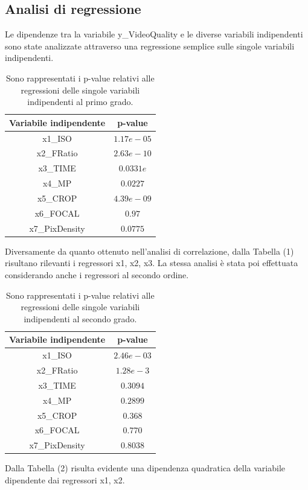 \subsection{Analisi di regressione}
Le dipendenze tra la variabile y\_VideoQuality e le diverse variabili indipendenti sono state analizzate attraverso una regressione semplice sulle singole variabili indipendenti.
\begin{table}[H]
	\centering
	\begin{tabular}{|c|c|}
		\hline
		\textbf{Variabile indipendente} & \textbf{p-value} \\
		\hline
		x1\_ISO & $1.17e-05$ \\
		\hline
		x2\_FRatio & $2.63e-10$ \\ 
		\hline
		x3\_TIME & $0.0331e$ \\
		\hline
		x4\_MP & $0.0227$ \\
		\hline
		x5\_CROP & $4.39e-09$ \\
		\hline
		x6\_FOCAL & $0.97$ \\
		\hline
		x7\_PixDensity & $0.0775$ \\
		\hline
	\end{tabular}
	\caption{Sono rappresentati i p-value relativi alle regressioni delle singole variabili indipendenti al primo grado.}
	\label{tab:}
\end{table}
Diversamente da quanto ottenuto nell'analisi di correlazione, dalla Tabella (1) risultano rilevanti i regressori x1, x2, x3. La stessa analisi è stata poi effettuata considerando anche i regressori al secondo ordine.

\begin{table}[H]
	\centering
	\begin{tabular}{|c|c|}
		\hline
		\textbf{Variabile indipendente} & \textbf{p-value} \\
		\hline
		x1\_ISO & $2.46e-03$ \\
		\hline
		x2\_FRatio & $1.28e-3$ \\ 
		\hline
		x3\_TIME & $0.3094$ \\
		\hline
		x4\_MP & $0.2899$ \\
		\hline
		x5\_CROP & $0.368$ \\
		\hline
		x6\_FOCAL & $0.770$ \\
		\hline
		x7\_PixDensity & $0.8038$ \\
		\hline
	\end{tabular}
	\caption{Sono rappresentati i p-value relativi alle regressioni delle singole variabili indipendenti al secondo grado.}
	\label{tab:}
\end{table}
Dalla Tabella (2) risulta evidente una dipendenza quadratica della variabile dipendente dai regressori x1, x2.

